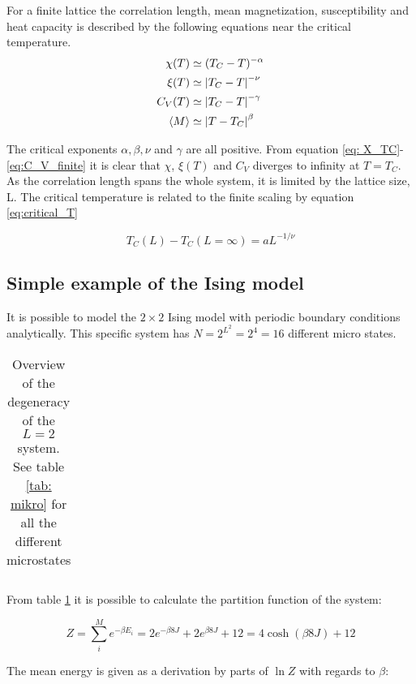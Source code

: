 For a finite lattice the correlation length, mean magnetization,  susceptibility and heat capacity  is described by the following equations  near the critical temperature. 
\begin{align}
	\chi(T) &\simeq (T_C-T)^{-\alpha}\label{eq: X_TC}\\
		\xi (T) &\simeq \abs{T_C-T}^{-\nu} \\
	C_V(T) &\simeq \abs{T_C-T}^{-\gamma} \label{eq:C_V_finite}\\
		\langle M\rangle &\simeq \abs{T-T_C}^{\beta}\\
 \end{align}

The critical exponents $ \alpha, \beta, \nu $ and $ \gamma $ are all positive. From equation \ref{eq: X_TC}-\ref{eq:C_V_finite} it is clear that $\chi$,  $\xi (T)$ and $ C_V $  diverges to infinity at $ T = T_C $. As the correlation length spans the whole system, it is limited by the lattice size, L. The critical temperature is related to the finite scaling by equation \ref{eq:critical_T}

\begin{equation}\label{eq:critical_T}
	T_C(L) - T_C(L=\infty) = a L^{-1/\nu}
\end{equation}




\subsection{Simple example of the Ising model \label{sec_L2}}

It is possible to model the $ 2\times 2 $ Ising model with periodic boundary conditions analytically. This specific system has $ N = 2^{L^2} = 2^4=16 $ different micro states. 


\begin{table}[H]
	\caption{Overview  of the degeneracy of the $ L=2 $ system. See table \ref{tab: mikro} for all the different microstates}
	\label{tab: makro}
	\begin{tabular}{cccccc}
		
	\end{tabular}
\end{table}

From table \ref{tab: makro} it is possible to calculate the partition function of the system: 

\[
Z = \sum_i^M e^{-\beta E_i} = 2e^{-\beta 8 J}  + 2e^{\beta 8 J} + 12 = 4 \cosh\left( \beta 8 J \right) + 12
\]

The mean energy is given as a derivation by parts of $ \ln Z $ with regards to $ \beta $:

